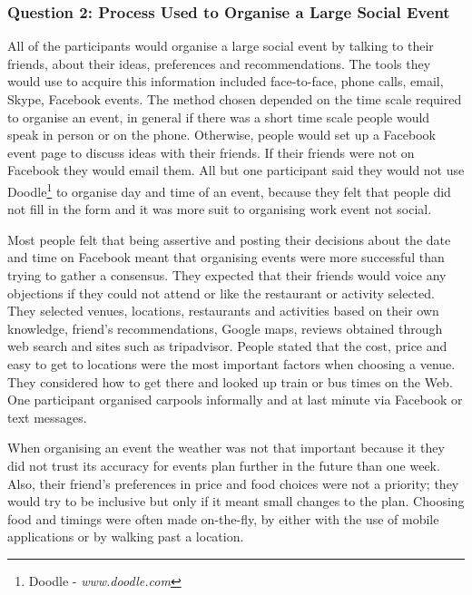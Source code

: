 \documentclass{sigchi}
\begin{document}
\subsubsection{Question 2: Process Used to Organise a Large Social Event}
All of the participants would organise a large social event by talking to their friends, about their ideas, preferences and recommendations.  The tools they would use to acquire this information included face-to-face, phone calls, email, Skype, Facebook events.  The method chosen depended on the time scale required to organise an event, in general if there was a short time scale people would speak in person or on the phone.  Otherwise, people would set up a Facebook event page to discuss ideas with their friends.  If their friends were not on Facebook they would email them.  All but one participant said they would not use Doodle\footnote{Doodle - \emph{www.doodle.com}} to organise day and time of an event, because they felt that people did not fill in the form and it was more suit to organising work event not social.  

Most people felt that being assertive and posting their decisions about the date and time on Facebook meant that organising events were more successful than trying to gather a consensus.  They expected that their friends would voice any objections if they could not attend or like the restaurant or activity selected.   They selected venues, locations, restaurants and activities based on their own knowledge, friend's recommendations, Google maps, reviews obtained through web search and sites such as tripadvisor.  People stated that the cost, price and easy to get to locations were the most important factors when choosing a venue.  They considered how to get there and looked up train or bus times on the Web.  One participant organised carpools informally and at last minute via Facebook or text messages.

When organising an event the weather was not that important because it they did not trust its accuracy for events plan further in the future than one week.  Also, their friend's preferences in price and food choices were not a priority; they would try to be inclusive but only if it meant small changes to the plan.  Choosing food and timings were often made on-the-fly, by either with the use of mobile applications or by walking past a location.
\end{document}
